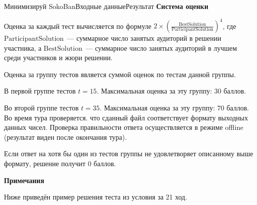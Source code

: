 \begin{problem}{Минимизируй SokoBan}{Входные данные}{Результат}{}
{\noindent\bf\problemsectionfont\textsf{Система оценки}}

Оценка за каждый тест вычисляется по формуле $2 \times\left(\frac{\text {BestSolution}}{\text {ParticipantSolution}}\right)^{4}$, где $\text{ParticipantSolution}$~--- суммарное число занятых аудиторий в решении участника, а $\text{BestSolution}$~--- суммарное число занятых аудиторий в лучшем среди участников и жюри решении.

Оценка за группу тестов является суммой оценок по тестам данной группы.

В первой группе тестов $t = 15$. Максимальная оценка за эту группу: $30$ баллов. 

Во второй группе тестов $t = 35$. Максимальная оценка за эту группу: $70$ баллов. Во время тура проверяется. что сданный файл соответствует формату выходных данных чисел. Проверка правильности ответа осуществляется в режиме offline (результат виден после окончания тура).

Если ответ на хотя бы один из тестов группы не удовлетворяет описанному выше формату, решение получит 0 баллов. 

{\noindent\bf\problemsectionfont\textsf{Примечания}}

Ниже приведён пример решения теста из условия за 21 ход.

\begin{figure}
\end{figure}


\Examples
\begin{example}
%
\end{example}


\end{problem} 


